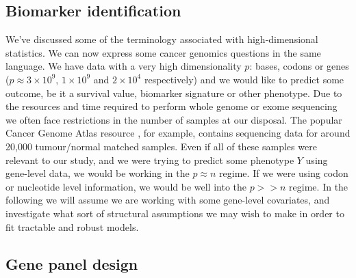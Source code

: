 \documentclass[thesis.tex]{subfiles}
\begin{document}
\subsection{Biomarker identification}
We've discussed some of the terminology associated with high-dimensional statistics. We can now express some cancer genomics questions in the same language. We have data with a very high dimensionality $p$: bases, codons or genes ($p \approx 3\times 10^9$, $1 \times 10^9$ and $2 \times 10^4$ respectively) and we would like to predict some outcome, be it a survival value, biomarker signature or other phenotype. Due to the resources and time required to perform whole genome or exome sequencing we often face restrictions in the number of samples at our disposal. The popular Cancer Genome Atlas resource \citep{weinstein_cancer_2013}, for example, contains sequencing data for around 20,000 tumour/normal matched samples. Even if all of these samples were relevant to our study, and we were trying to predict some phenotype $Y$ using gene-level data, we would be working in the $p \approx n$ regime. If we were using codon or nucleotide level information, we would be well into the $p >> n$ regime. In the following we will assume we are working with some gene-level covariates, and investigate what sort of structural assumptions we may wish to make in order to fit tractable and robust models. 

\subsection{Gene panel design}
\end{document}
